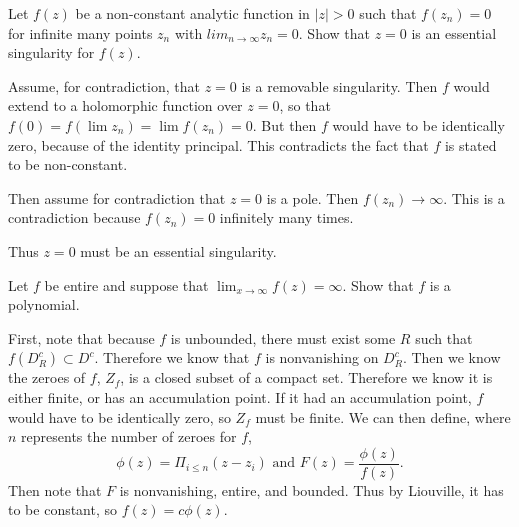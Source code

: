 \documentclass[12pt]{article}
\begin{document}
\begin{statement}
  Let $f(z)$ be a non-constant analytic function in $\vert z \vert > 0$ such that $f(z_n)=0$ for infinite 
  many points $z_n$ with $lim_{n \to \infty}z_n=0$. Show that $z=0$ is an essential singularity for $f(z)$.
\end{statement}
\begin{newproof}
  Assume, for contradiction, that $z=0$ is a removable singularity. Then $f$ would extend to a holomorphic 
  function over $z=0$, so that $f(0)=f(\lim z_n)=\lim f(z_n) = 0$. But then $f$ would have to be identically 
  zero, because of the identity principal. This contradicts the fact that $f$ is stated to be non-constant.
  \par Then assume for contradiction that $z=0$ is a pole. Then $f(z_n) \to \infty$. This is a contradiction
  because $f(z_n)=0$ infinitely many times.
  \par Thus $z=0$ must be an essential singularity. 
\end{newproof}

\begin{statement}
  Let $f$ be entire and suppose that $\lim_{x \to \infty} f(z) = \infty$. Show that $f$ is a polynomial.
\end{statement}
\begin{newproof}
  First, note that because $f$ is unbounded, there must exist some $R$ such that $f(D^c_R) \subset D^c$. 
  Therefore we know that $f$ is nonvanishing on $D^c_R$. Then we know the zeroes of $f$, $Z_f$, is a 
  closed subset of a compact set. Therefore we know it is either finite, or has an accumulation point.
  If it had an accumulation point, $f$ would have to be identically zero, so $Z_f$ must be finite. We can 
  then define, where $n$ represents the number of zeroes for $f$, 
  \begin{equation*}
    \phi (z) = \Pi_{i \leq n} (z-z_i) \text{ and } F(z)= \frac{\phi (z)}{f(z)}.
  \end{equation*}
  Then note that $F$ is nonvanishing, entire, and bounded. Thus by Liouville, it has to be constant, so 
  $f(z)=c \phi(z)$.
\end{newproof}
\end{document}
